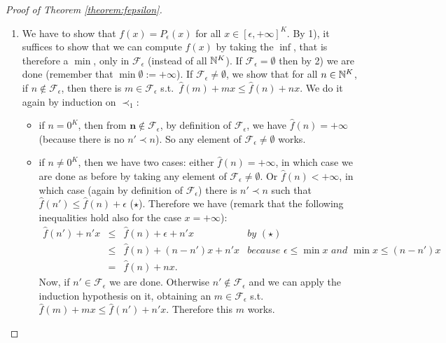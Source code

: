 \begin{proof}[Proof of Theorem \ref{theorem:fepsilon}]
\begin{enumerate}
\item We have to show that $f( x )=P_\epsilon( x )$ for all $ x \in [\epsilon,+\infty]^{K}$.
By 1), it suffices to show that we can compute $f( x )$ by taking the $\inf$, that is therefore a $\min$, only in $\mathcal F_\epsilon$ (instead of all $\mathbb{N}^{K}$).
If $\mathcal F_\epsilon=\emptyset$ then by 2) we are done (remember that $\min\emptyset := +\infty$).
If $\mathcal F_\epsilon\neq\emptyset$, we show that for all $ n  \in\mathbb{N}^{K}$, if $ n   \notin\mathcal F_\epsilon$, then there is $ m  \in\mathcal F_\epsilon$ s.t.\ $\hat f( m  )+ m   x  \leq \hat f( n  )+ n   x $.
We do it again by induction on $\prec_{1}$:
\begin{itemize}
\item if $ n  =0^{K}$, then from $\mathbf  n\notin \mathcal F_{\epsilon}$, by definition of $\mathcal F_\epsilon$, we have $\hat f( n  )=+\infty$ (because there is no $ n  '\prec n  $).
So any element of $\mathcal F_\epsilon\neq\emptyset$ works.

\item if $ n  \neq 0^{K}$, then we have two cases:
either $\hat f( n  )=+\infty$, in which case we are done as before by taking any element of $\mathcal F_\epsilon\neq\emptyset$.
Or $\hat f( n  )<+\infty$, in which case (again by definition of $\mathcal F_\epsilon$) there is $ n  '\prec n  $ such that $ \hat f( n  ')\leq \hat f( n  )+\epsilon$  ($\star$).
Therefore we have (remark that the following inequalities hold also for the case $x=+\infty$):
\[\begin{array}{rclr}
 \hat f( n  ')+ n  ' x  & \leq & \hat f( n  ) + \epsilon +  n' x  & \textit{by }(\star) \\
 & \leq & \hat f( n  ) + ( n  - n  ') x  +  n  ' x  & \textit{because $\epsilon\leq\min x $ and $\min  x \leq( n  -  n') x $} \\
 & = & \hat f( n  )+  n   x . &
\end{array}\]
Now, if $ n  '\in\mathcal F_\epsilon$ we are done.
Otherwise $ n  '\notin\mathcal F_\epsilon$ and we can apply the induction hypothesis on it, obtaining an $ m  \in\mathcal F_\epsilon$ s.t.\ $\hat f( m  )+ m   x  \leq \hat f( n  ')+ n  ' x $.
Therefore this $ m  $ works.
\end{itemize}
\end{enumerate}
\end{proof}





%

